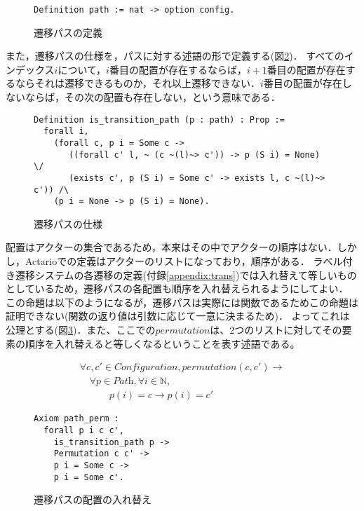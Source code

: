 \begin{figure}[tp]
\begin{lstlisting}
Definition path := nat -> option config.
\end{lstlisting}
  \caption{遷移パスの定義}\label{code:formalization:path}
\end{figure}

また，遷移パスの仕様を，パスに対する述語の形で定義する(図\ref{code:formalization:path-spec})．
すべてのインデックス$i$について，$i$番目の配置が存在するならば，$i+1$番目の配置が存在するならそれは遷移できるものか，それ以上遷移できない．$i$番目の配置が存在しないならば，その次の配置も存在しない，という意味である．

\begin{figure}[tp]
\begin{lstlisting}
Definition is_transition_path (p : path) : Prop :=
  forall i,
    (forall c, p i = Some c ->
       ((forall c' l, ~ (c ~(l)~> c')) -> p (S i) = None) \/
       (exists c', p (S i) = Some c' -> exists l, c ~(l)~> c')) /\
    (p i = None -> p (S i) = None).
\end{lstlisting}
  \caption{遷移パスの仕様}\label{code:formalization:path-spec}
\end{figure}

配置はアクターの集合であるため，本来はその中でアクターの順序はない．しかし，Actarioでの定義はアクターのリストになっており，順序がある．
ラベル付き遷移システムの各遷移の定義(付録\ref{appendix:trans})では入れ替えて等しいものとしているため，遷移パスの各配置も順序を入れ替えられるようにしてよい．
この命題は以下のようになるが，遷移パスは実際には関数であるためこの命題は証明できない(関数の返り値は引数に応じて一意に決まるため)．
よってこれは公理とする(図\ref{code:proof:path-perm})．また、ここでの$permutation$は、2つのリストに対してその要素の順序を入れ替えると等しくなるということを表す述語である。

\begin{displaymath}
  \begin{array}{l}
    \forall c, c' \in \textit{Configuration}, permutation(c, c') \rightarrow \\
    \quad \forall p \in \textit{Path}, \forall i \in \mathbb{N}, \\
    \quad \quad \quad p(i) = c \rightarrow p(i) = c'
  \end{array}
\end{displaymath}

\begin{figure}[tp]
\begin{lstlisting}
Axiom path_perm :
  forall p i c c',
    is_transition_path p ->
    Permutation c c' ->
    p i = Some c ->
    p i = Some c'.
\end{lstlisting}
  \caption{遷移パスの配置の入れ替え}\label{code:proof:path-perm}
\end{figure}


